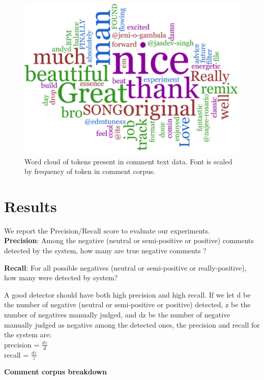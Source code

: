 \documentclass[12pt]{dalcsthesis}
\begin{document}
\begin{figure}[h]
\includegraphics[scale=.45]{word_cloud}
\centering
\caption{Word cloud of tokens present in comment text data. Font is scaled by frequency of token in comment corpus.}
\end{figure}

\section{Results}

We report the Precision/Recall score to evaluate our experiments.  \\

\noindent
\textbf{Precision}: Among the negative (neutral or semi-positive or positive) comments detected by the system, how many are true negative comments ?

\noindent
\textbf{Recall}: For all possible negatives (neutral or semi-positive or really-positive), how many were detected by system?

A good detector should have both high precision and high recall. If we let d be the number of negative (neutral or semi-positive or positive) detected, z be the number of negatives manually judged, and dz be the number of negative manually judged as negative among the detected ones, the precision and recall for the system are: \\

\noindent
precision = $\frac{dz}{d}$ \\
recall = $\frac{dz}{z}$

\noindent
\textbf{Comment corpus breakdown}
\end{document}
